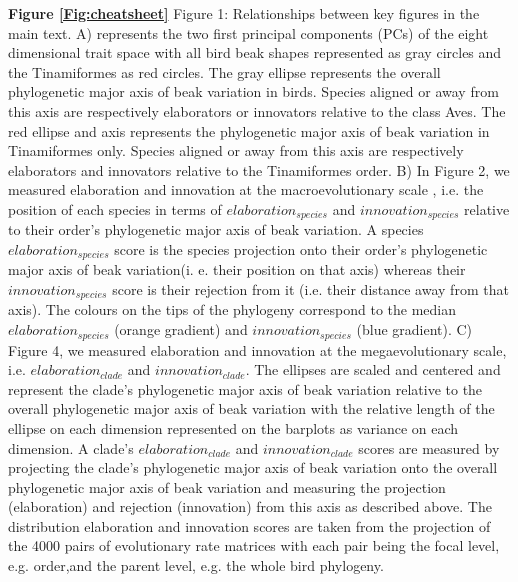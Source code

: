 \documentclass[12pt,letterpaper]{article}
\begin{document}
\noindent \textbf{Figure \ref{Fig:cheatsheet}}
Figure 1:
Relationships between key figures in the main text.
A) represents the two first principal components (PCs) of the eight dimensional trait space with all bird beak shapes represented as gray circles and the Tinamiformes as red circles.
The gray ellipse represents the overall phylogenetic major axis of beak variation in birds.
Species aligned or away from this axis are respectively elaborators or innovators relative to the class Aves.
The red ellipse and axis represents the phylogenetic major axis of beak variation in Tinamiformes only.
Species aligned or away from this axis are respectively elaborators and innovators relative to the Tinamiformes order.
B) In Figure 2, we measured elaboration and innovation at the macroevolutionary scale , i.e. the position of each species in terms of $elaboration_{species}$ and $innovation_{species}$ relative to their order's phylogenetic major axis of beak variation.
A species $elaboration_{species}$ score is the species projection onto their order's phylogenetic major axis of beak variation(i. e. their position on that axis) whereas their $innovation_{species}$ score is their rejection from it (i.e. their distance away from that axis).
The colours on the tips of the phylogeny correspond to the median $elaboration_{species}$ (orange gradient) and $innovation_{species}$ (blue gradient).
C) Figure 4, we measured elaboration and innovation at the megaevolutionary scale, i.e. $elaboration_{clade}$ and $innovation_{clade}$.
The ellipses are scaled and centered and represent the clade's phylogenetic major axis of beak variation relative to the overall phylogenetic major axis of beak variation with the relative length of the ellipse on each dimension represented on the barplots as variance on each dimension.
A clade's $elaboration_{clade}$ and $innovation_{clade}$ scores are measured by projecting the clade's phylogenetic major axis of beak variation onto the overall phylogenetic major axis of beak variation and measuring the projection (elaboration) and rejection (innovation) from this axis as described above.
The distribution elaboration and innovation scores are taken from the projection of the 4000 pairs of evolutionary rate matrices with each pair being the focal level, e.g. order,and the parent level, e.g. the whole bird phylogeny.
\end{document}

